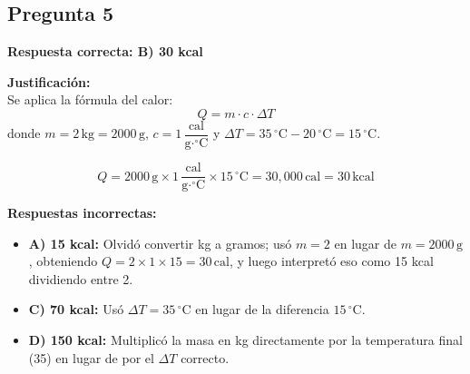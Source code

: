 \begin{respuestabox}
\subsection*{Pregunta 5}
\textcolor{verdecorrecto}{\textbf{Respuesta correcta: B) 30 kcal}}

\textbf{Justificación:}\\
Se aplica la fórmula del calor:
$$Q = m \cdot c \cdot \Delta T$$
donde $m = 2\,\text{kg} = 2000\,\text{g}$, $c = 1\,\dfrac{\text{cal}}{\text{g}\cdot^\circ\text{C}}$ y $\Delta T = 35\,^\circ\text{C} - 20\,^\circ\text{C} = 15\,^\circ\text{C}$.

$$Q = 2000\,\text{g} \times 1\,\frac{\text{cal}}{\text{g}\cdot^\circ\text{C}} \times 15\,^\circ\text{C} = 30{,}000\,\text{cal} = 30\,\text{kcal}$$

\textbf{Respuestas incorrectas:}
\begin{itemize}
    \item \textbf{A) 15 kcal:} Olvidó convertir kg a gramos; usó $m = 2$ en lugar de $m = 2000\,\text{g}$, obteniendo $Q = 2 \times 1 \times 15 = 30\,\text{cal}$, y luego interpretó eso como 15 kcal dividiendo entre 2.
    \item \textbf{C) 70 kcal:} Usó $\Delta T = 35\,^\circ\text{C}$ en lugar de la diferencia $15\,^\circ\text{C}$.
    \item \textbf{D) 150 kcal:} Multiplicó la masa en kg directamente por la temperatura final (35) en lugar de por el $\Delta T$ correcto.
\end{itemize}
\end{respuestabox}

